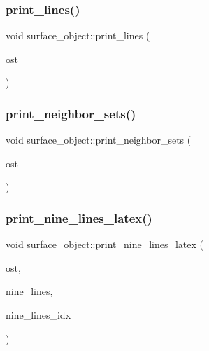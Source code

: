 \mbox{\label{classsurface__object_a778d359240ca044debd3cca2d7f85762}} 
\subsubsection{\texorpdfstring{print\+\_\+lines()}{print\_lines()}}
{\footnotesize\ttfamily void surface\+\_\+object\+::print\+\_\+lines (\begin{DoxyParamCaption}\item[{ostream \&}]{ost }\end{DoxyParamCaption})}

\mbox{\label{classsurface__object_abe0201b117e124fccff446f61b0faa47}} 
\subsubsection{\texorpdfstring{print\+\_\+neighbor\+\_\+sets()}{print\_neighbor\_sets()}}
{\footnotesize\ttfamily void surface\+\_\+object\+::print\+\_\+neighbor\+\_\+sets (\begin{DoxyParamCaption}\item[{ostream \&}]{ost }\end{DoxyParamCaption})}

\mbox{\label{classsurface__object_ad1dea918afb2e6c9e19f575a851f776a}} 
\subsubsection{\texorpdfstring{print\+\_\+nine\+\_\+lines\+\_\+latex()}{print\_nine\_lines\_latex()}}
{\footnotesize\ttfamily void surface\+\_\+object\+::print\+\_\+nine\+\_\+lines\+\_\+latex (\begin{DoxyParamCaption}\item[{ostream \&}]{ost,  }\item[{\mbox{\hyperlink{galois_8h_a09fddde158a3a20bd2dcadb609de11dc}{I\+NT}} $\ast$}]{nine\+\_\+lines,  }\item[{\mbox{\hyperlink{galois_8h_a09fddde158a3a20bd2dcadb609de11dc}{I\+NT}} $\ast$}]{nine\+\_\+lines\+\_\+idx }\end{DoxyParamCaption})}

